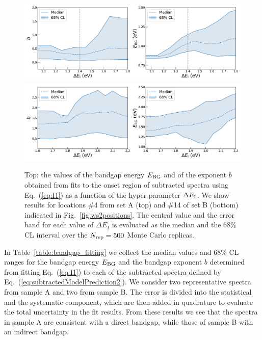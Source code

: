 
\begin{figure}[t]
\begin{centering}
  \includegraphics[width=0.6\linewidth]{plots/Stability_plots_sp4.pdf}
  \includegraphics[width=0.6\linewidth]{plots/Stability_plots_sp14.pdf} 
  \caption{Top: the values of the bandgap energy $E_{\rm BG}$ and of the exponent $b$
  obtained from fits to the onset
  region of subtracted spectra using Eq.~(\ref{eq:I1}) as a function
  of the hyper-parameter $\Delta E_{\rm I}$.
  We show results for locations \#4 from set A (top)
  and \#14 of set B (bottom) indicated in Fig.~\ref{fig:ws2positions}.
  The central value and the error band for each value of $\Delta E_I$ is evaluated
  as the median and the 68\% CL interval over the $N_{\rm rep}=500$ Monte Carlo replicas.
  }
\label{fig:bvalues}
\end{centering}
\end{figure}

In Table~\ref{table:bandgap_fitting} we collect
 the median values and 68\% CL ranges for the bandgap energy $E_{\rm BG}$
 and the bandgap exponent $b$ determined from fitting Eq.~(\ref{eq:I1}) to each of the subtracted
 spectra defined by Eq.~(\ref{eq:subtractedModelPrediction2}).
 We consider two representative spectra from sample A and two
 from sample B. 
 The error is divided into the statistical and the systematic component, which are
 then added in quadrature to evaluate the total uncertainty in the fit results. 
 From these results we see that the spectra in sample A are consistent with a direct bandgap,
 while those of sample B with an indirect bandgap.

